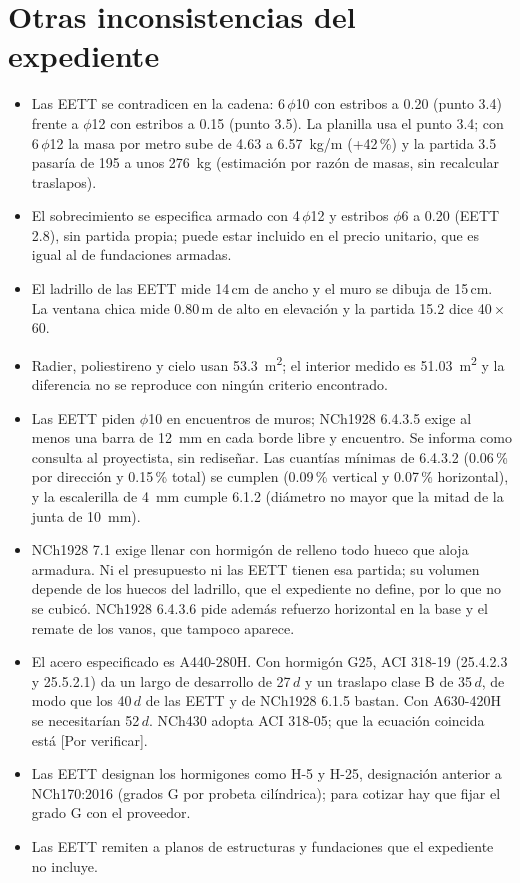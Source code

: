 \documentclass[letterpaper,10pt]{article}
\begin{document}
\section{Otras inconsistencias del expediente}
\begin{itemize}[nosep]
\item Las EETT se contradicen en la cadena: 6\,$\phi$10 con estribos a 0.20 (punto 3.4) frente a $\phi$12 con estribos a 0.15 (punto 3.5). La planilla usa el punto 3.4; con 6\,$\phi$12 la masa por metro sube de 4.63 a \SI{6.57}{kg/m} (+42\,\%) y la partida 3.5 pasaría de 195 a unos \SI{276}{kg} (estimación por razón de masas, sin recalcular traslapos).
\item El sobrecimiento se especifica armado con 4\,$\phi$12 y estribos $\phi$6 a 0.20 (EETT 2.8), sin partida propia; puede estar incluido en el precio unitario, que es igual al de fundaciones armadas.
\item El ladrillo de las EETT mide 14\,cm de ancho y el muro se dibuja de 15\,cm. La ventana chica mide 0.80\,m de alto en elevación y la partida 15.2 dice 40\,$\times$\,60.
\item Radier, poliestireno y cielo usan \SI{53.3}{m^2}; el interior medido es \SI{51.03}{m^2} y la diferencia no se reproduce con ningún criterio encontrado.
\item Las EETT piden $\phi$10 en encuentros de muros; NCh1928 6.4.3.5 exige al menos una barra de \SI{12}{mm} en cada borde libre y encuentro. Se informa como consulta al proyectista, sin rediseñar. Las cuantías mínimas de 6.4.3.2 (0.06\,\% por dirección y 0.15\,\% total) se cumplen (0.09\,\% vertical y 0.07\,\% horizontal), y la escalerilla de \SI{4}{mm} cumple 6.1.2 (diámetro no mayor que la mitad de la junta de \SI{10}{mm}).
\item NCh1928 7.1 exige llenar con hormigón de relleno todo hueco que aloja armadura. Ni el presupuesto ni las EETT tienen esa partida; su volumen depende de los huecos del ladrillo, que el expediente no define, por lo que no se cubicó. NCh1928 6.4.3.6 pide además refuerzo horizontal en la base y el remate de los vanos, que tampoco aparece.
\item El acero especificado es A440-280H. Con hormigón G25, ACI 318-19 (25.4.2.3 y 25.5.2.1) da un largo de desarrollo de 27\,$d$ y un traslapo clase B de 35\,$d$, de modo que los 40\,$d$ de las EETT y de NCh1928 6.1.5 bastan. Con A630-420H se necesitarían 52\,$d$. NCh430 adopta ACI 318-05; que la ecuación coincida está [Por verificar].
\item Las EETT designan los hormigones como H-5 y H-25, designación anterior a NCh170:2016 (grados G por probeta cilíndrica); para cotizar hay que fijar el grado G con el proveedor.
\item Las EETT remiten a planos de estructuras y fundaciones que el expediente no incluye.
\end{itemize}
\end{document}
